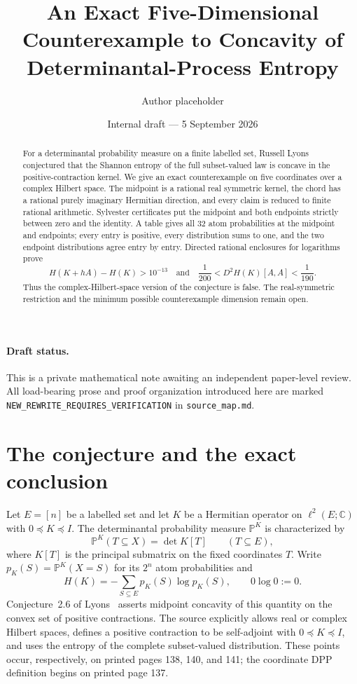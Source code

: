\documentclass[11pt]{article}
\title{An Exact Five-Dimensional Counterexample to Concavity of Determinantal-Process Entropy}
\author{Author placeholder}
\date{Internal draft --- 5 September 2026}
\newcommand{\C}{\mathbb C}
\newcommand{\PP}{\mathbb P}
\begin{document}
\maketitle

\begin{abstract}
For a determinantal probability measure on a finite labelled set, Russell Lyons
conjectured that the Shannon entropy of the full subset-valued law is concave in
the positive-contraction kernel.  We give an exact counterexample on five
coordinates over a complex Hilbert space.  The midpoint is a rational real
symmetric kernel, the chord has a rational purely imaginary Hermitian direction,
and every claim is reduced to finite rational arithmetic.  Sylvester certificates
put the midpoint and both endpoints strictly between zero and the identity.  A
table gives all 32 atom probabilities at the midpoint and endpoints; every entry
is positive, every distribution sums to one, and the two endpoint distributions
agree entry by entry.  Directed rational enclosures for logarithms prove
\[
 H(K+hA)-H(K)>10^{-13}
 \quad\text{and}\quad
 \frac1{200}<D^2H(K)[A,A]<\frac1{190}.
\]
Thus the complex-Hilbert-space version of the conjecture is false.  The
real-symmetric restriction and the minimum possible counterexample dimension
remain open.
\end{abstract}

\paragraph{Draft status.}
This is a private mathematical note awaiting an independent paper-level review.
All load-bearing prose and proof organization introduced here are marked
\texttt{NEW\_REWRITE\_REQUIRES\_VERIFICATION} in \texttt{source\_map.md}.

\section{The conjecture and the exact conclusion}

Let $E=[n]$ be a labelled set and let $K$ be a Hermitian operator on
$\ell^2(E;\C)$ with $0\preceq K\preceq I$.  The determinantal probability
measure $\PP^K$ is characterized by
\begin{equation}\label{eq:inclusion}
 \PP^K(T\subseteq X)=\det K[T]\qquad(T\subseteq E),
\end{equation}
where $K[T]$ is the principal submatrix on the fixed coordinates $T$.  Write
$p_K(S)=\PP^K(X=S)$ for its $2^n$ atom probabilities and
\begin{equation}\label{eq:entropy}
 H(K)=-\sum_{S\subseteq E}p_K(S)\log p_K(S),
 \qquad 0\log0:=0.
\end{equation}
Conjecture~2.6 of Lyons~\cite{Lyons2014} asserts midpoint concavity of this
quantity on the convex set of positive contractions.  The source explicitly
allows real or complex Hilbert spaces, defines a positive contraction to be
self-adjoint with $0\preceq K\preceq I$, and uses the entropy of the complete
subset-valued distribution.  These points occur, respectively, on printed pages
138, 140, and 141; the coordinate DPP definition begins on printed page 137.
\end{document}
